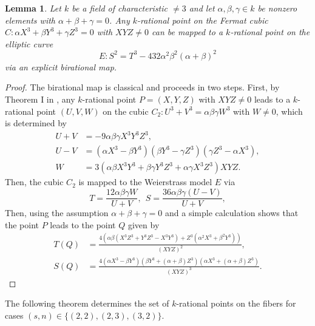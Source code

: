 \documentclass[11pt, a4paper]{amsart}
\newtheorem{lema}[thm]{Lemma}
\theoremstyle{definition}
\begin{document}
\begin{lema} \label{lem:fermat_to_weierstrass}
	Let $k$ be a field of characteristic $\neq 3$ and let $\alpha, \beta, \gamma \in k$ be nonzero elements with $\alpha+\beta+\gamma=0$. Any $k$-rational point on the Fermat cubic $C: \alpha X^3 + \beta Y^3 + \gamma Z^3 = 0$ with $XYZ \neq 0$ can be mapped to a $k$-rational point on the elliptic curve
	\[ E: S^2 = T^3 - 432\alpha^2\beta^2(\alpha+\beta)^2 \]
	via an explicit birational map.
\end{lema}
\begin{proof}
	The birational map is classical and proceeds in two steps. First,  by Theorem I in \cite{Selmer1951}, any $k$-rational point $P=(X,Y,Z)$ with $XYZ\not =0$
	leads to a $k$-rational point $(U,V, W)$ on the cubic $C_2: U^3+V^3= \alpha \beta \gamma W^3$ with $W \not =0$, which is determined by 
	\begin{equation}
		\label{cub1}
		\begin{split}
			U+V & = -9  \alpha \beta \gamma X^3 Y^3 Z^3,  \\
			U-V & =  (\alpha X^3 - \beta Y^3) (\beta Y^3 - \gamma Z^3) (\gamma Z^3-\alpha X^3),\\
			W& = 3 (\alpha \beta X^3 Y^3 +  \beta \gamma  Y^3 Z^3  +  \alpha \gamma  X^3 Z^3) XYZ.
		\end{split}
	\end{equation}
	Then, the cubic $C_2$ is mapped to the Weierstrass model $E$ via 
	$$T=  \frac{12 \alpha \beta \gamma W}{U+V}, \  \ S= \frac{36 \alpha \beta \gamma(U-V)}{U+V},$$ 
	Then, using the assumption  $\alpha +\beta + \gamma=0$ and a simple calculation shows that the point  $P$ leads to the point $Q$ given by  
	\begin{equation}
		\label{pst}
		\begin{split}
			T(Q) & = \frac{4\left( \alpha \beta (X^3 Z^3 + Y^3 Z^3 - X^3 Y^3) + 
				Z^3 ( \alpha^2 X^3 + \beta^2Y^3)  \right) }{(XYZ)^2},  \\
			S(Q) & =  \frac{4 (\alpha X^3 - \beta Y^3)(\beta Y^3 + (\alpha+ \beta) Z^3)(\alpha X^3+(\alpha+ \beta) Z^3)}{ (XYZ)^3}.
		\end{split}
	\end{equation}	
\end{proof}

The following theorem  determines the set of $k$-rational points on the fibers for  cases
$(s,n) \in \{(2,2), (2,3), (3,2)\}$.
\end{document}

